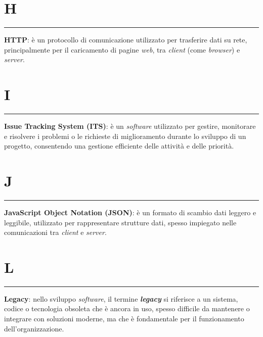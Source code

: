 \section*{H}
{\color{lightgray}\rule{\textwidth}{0.4pt}} %
\begin{glossaryitemize}
    \item \textbf{HTTP}: è un protocollo di comunicazione utilizzato per trasferire dati su rete, principalmente per il caricamento di pagine \textit{web}, tra \textit{client} (come \textit{browser}) e \textit{server}.
\end{glossaryitemize}

\section*{I}
{\color{lightgray}\rule{\textwidth}{0.4pt}} %
\begin{glossaryitemize}
    \item \textbf{Issue Tracking System (ITS)}: è un \textit{software} utilizzato per gestire, monitorare e risolvere i problemi o le richieste di miglioramento durante lo sviluppo di un progetto, consentendo una gestione efficiente delle attività e delle priorità.
\end{glossaryitemize}

\section*{J}
{\color{lightgray}\rule{\textwidth}{0.4pt}} %
\begin{glossaryitemize}
    \item \textbf{JavaScript Object Notation (JSON)}: è un formato di scambio dati leggero e leggibile, utilizzato per rappresentare strutture dati, spesso impiegato nelle comunicazioni tra \textit{client} e \textit{server}.
\end{glossaryitemize}

\section*{L}
{\color{lightgray}\rule{\textwidth}{0.4pt}} %
\begin{glossaryitemize}
    \item \textbf{Legacy}: nello sviluppo \textit{software}, il termine \textit{\textbf{legacy}} si riferisce a un sistema, codice o tecnologia obsoleta che è ancora in uso, spesso difficile da mantenere o integrare con soluzioni moderne, ma che è fondamentale per il funzionamento dell'organizzazione.
\end{glossaryitemize}

